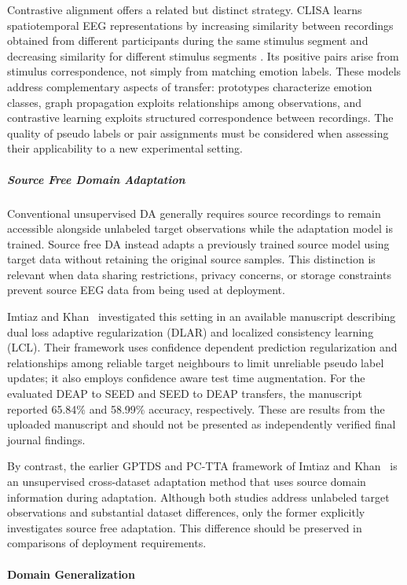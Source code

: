 \documentclass[ASNA,twocolumn]{USG}
\begin{document}
Contrastive alignment offers a related but distinct strategy. CLISA learns spatiotemporal EEG representations by increasing similarity between recordings obtained from different participants during the same stimulus segment and decreasing similarity for different stimulus segments \cite{shen2022contrastive}. Its positive pairs arise from stimulus correspondence, not simply from matching emotion labels. These models address complementary aspects of transfer: prototypes characterize emotion classes, graph propagation exploits relationships among observations, and contrastive learning exploits structured correspondence between recordings. The quality of pseudo labels or pair assignments must be considered when assessing their applicability to a new experimental setting.

\subparagraph{Source Free Domain Adaptation}

Conventional unsupervised DA generally requires source recordings to remain accessible alongside unlabeled target observations while the adaptation model is trained. Source free DA instead adapts a previously trained source model using target data without retaining the original source samples. This distinction is relevant when data sharing restrictions, privacy concerns, or storage constraints prevent source EEG data from being used at deployment.

Imtiaz and Khan~\cite{imtiaz2026towards} investigated this setting in an available manuscript describing dual loss adaptive regularization (DLAR) and localized consistency learning (LCL). Their framework uses confidence dependent prediction regularization and relationships among reliable target neighbours to limit unreliable pseudo label updates; it also employs confidence aware test time augmentation. For the evaluated DEAP to SEED and SEED to DEAP transfers, the manuscript reported 65.84\% and 58.99\% accuracy, respectively. These are results from the uploaded manuscript and should not be presented as independently verified final journal findings.

By contrast, the earlier GPTDS and PC-TTA framework of Imtiaz and Khan~\cite{imtiaz2025enhanced} is an unsupervised cross-dataset adaptation method that uses source domain information during adaptation. Although both studies address unlabeled target observations and substantial dataset differences, only the former explicitly investigates source free adaptation. This difference should be preserved in comparisons of deployment requirements.

\paragraph{Domain Generalization}
\end{document}
